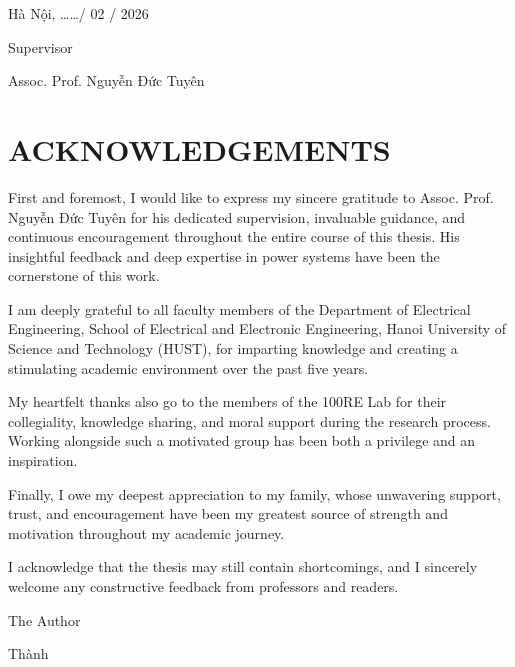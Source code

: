 \documentclass{thesis_1side}
\begin{document}
\vspace{6pt}
    \hspace{7cm} Hà Nội, \ldots\ldots / 02 / 2026

    \hspace{8.6cm} Supervisor

\vspace{2cm}
    \hspace{7.8cm} Assoc. Prof. Nguyễn Đức Tuyên

\thispagestyle{empty}
    \clearpage
        \thispagestyle{empty}

\section*{ACKNOWLEDGEMENTS}

First and foremost, I would like to express my sincere gratitude to
Assoc. Prof. Nguyễn Đức Tuyên for his dedicated supervision,
invaluable guidance, and continuous encouragement throughout the entire course
of this thesis. His insightful feedback and deep expertise in power systems
have been the cornerstone of this work.

I am deeply grateful to all faculty members of the Department of
Electrical Engineering, School of Electrical and Electronic Engineering,
Hanoi University of Science and Technology (HUST), for imparting knowledge
and creating a stimulating academic environment over the past five years.

My heartfelt thanks also go to the members of the 100RE Lab for their
collegiality, knowledge sharing, and moral support during the research process.
Working alongside such a motivated group has been both a privilege and an
inspiration.

Finally, I owe my deepest appreciation to my family, whose unwavering
support, trust, and encouragement have been my greatest source of strength and
motivation throughout my academic journey.

I acknowledge that the thesis may still contain shortcomings, and I sincerely
welcome any constructive feedback from professors and readers.

\vspace{0.5cm}
    \hspace{9.1cm} The Author

\vspace{0.5cm}
    \hspace{10cm} Thành
\end{document}
